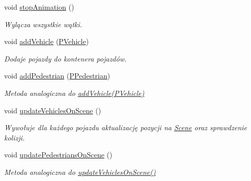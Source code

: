 \begin{DoxyCompactItemize}
void \hyperlink{class_animation_a0de8514303e0146cb61b4b5838f832ed}{stop\-Animation} ()
\begin{DoxyCompactList}\small\item\em Wylącza wszystkie wątki. \end{DoxyCompactList}\item 
void \hyperlink{class_animation_a269bdbdd4ee7fd5513d99fb16fce5e84}{add\-Vehicle} (\hyperlink{_types_8h_a564207d327881e8bcfa0843e1a874756}{P\-Vehicle})
\begin{DoxyCompactList}\small\item\em Dodaje pojazdy do kontenera pojazdów. \end{DoxyCompactList}\item 
void \hyperlink{class_animation_a2f3e2091c26d247f70f20213f3f76d2c}{add\-Pedestrian} (\hyperlink{_types_8h_a6ca5cb67bb3df872d4650820dbc647b8}{P\-Pedestrian})
\begin{DoxyCompactList}\small\item\em Metoda analogiczna do \hyperlink{class_animation_a269bdbdd4ee7fd5513d99fb16fce5e84}{add\-Vehicle(\-P\-Vehicle)} \end{DoxyCompactList}\item 
void \hyperlink{class_animation_a74ed4d5c9ac4437a4cf70dd0003aed29}{update\-Vehicles\-On\-Scene} ()
\begin{DoxyCompactList}\small\item\em Wywołuje dla każdego pojazdu aktualizację pozycji na \hyperlink{class_scene}{Scene} oraz sprawdzenie kolizji. \end{DoxyCompactList}\item 
void \hyperlink{class_animation_a06fefc128b5577d5d61b08f7e9f3338b}{update\-Pedestrians\-On\-Scene} ()
\begin{DoxyCompactList}\small\item\em Metoda analogiczna do \hyperlink{class_animation_a74ed4d5c9ac4437a4cf70dd0003aed29}{update\-Vehicles\-On\-Scene()} \end{DoxyCompactList}\end{DoxyCompactItemize}

